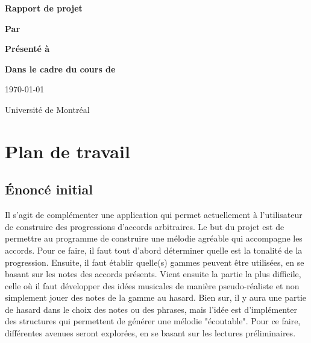 \documentclass[letterpaper,12pt]{scrartcl}
\begin{document}
	\begin{center}
		\vspace{2cm}

		{\Huge\bf\sf Rapport de projet}
		\vspace{4cm}

		{\bf\sf Par}

		\vspace{0.5cm}{\large\bf\sf François Poitras}

		\vspace{2cm}

		{\bf\sf Présenté à}

		\vspace{0.5cm}{\large\bf\sf Olivier Bélanger et Sylvie Hamel}

		\vspace{2cm}

		{\bf\sf Dans le cadre du cours de}

		\vspace{0.5cm}{\large\bf\sf Projet d'informatique (IFT3150)}

		\vspace{\fill}
		
		\today

		\vspace{0.5cm}
		Université de Montréal
	\end{center}

	\newpage
	\pagestyle{plain}
	\section{Plan de travail}
	
	\subsection{Énoncé initial}
	Il s'agit de complémenter une application qui permet actuellement à l'utilisateur de construire des progressions d'accords arbitraires. Le but du projet est de permettre au programme de construire une mélodie agréable qui accompagne les accords. Pour ce faire, il faut tout d'abord déterminer quelle est la tonalité de la progression. Ensuite, il faut établir quelle(s) gammes peuvent être utilisées, en se basant sur les notes des accords présents. Vient ensuite la partie la plus difficile, celle où il faut développer des idées musicales de manière pseudo-réaliste et non simplement jouer des notes de la gamme au hasard. Bien sur, il y aura une partie de hasard dans le choix des notes ou des phrases, mais l'idée est d'implémenter des structures qui permettent de générer une mélodie "écoutable". Pour ce faire, différentes avenues seront explorées, en se basant sur les lectures préliminaires. 
\end{document}
